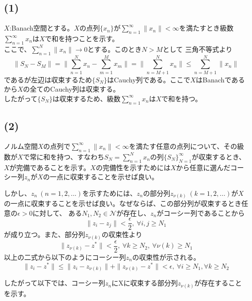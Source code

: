 \documentclass[a4paper,10pt]{jsarticle}
\begin{document}
\subsection{(1)}
$X$:Banach空間とする。$X$の点列$\{x_n\}$が$\sum_{n=1}^\infty \|x_n\| < \infty$を満たすとき級数$\sum_{n=1}^\infty x_n$は$X$で和を持つことを示す。\\

ここで、$\sum_{n=1}^N\|x_n\|\to0$とする。このとき$N>M$として
三角不等式より
\begin{equation}
 \|S_N-S_M\|=\|\sum_{n=1}^Nx_n -\sum_{m=1}^Mx_m\|=\|\sum_{n=M+1}^Nx_n\|\le\sum_{n=M+1}^N\|x_n\|
\end{equation}
であるが左辺は収束するため$\{S_N\}$はCauchy列である。ここで$X$はBanachであるから$X$の全てのCauchy列は収束する。\\
したがって$\{S_N\}$は収束するため、級数$\sum_{n=1}^\infty x_n$は$X$で和を持つ。

\subsection{(2)}
ノルム空間$X$の点列で$\sum_{n=1}^\infty \|x_n\| < \infty$を満たす任意の点列について、その級数が$X$で常に和を持つ、すなわち$S_N = \sum_{n=1}^N x_n$の列$\{S_N\}_{N=1}^\infty$が収束するとき、
$X$が完備であることを示す。$X$の完備性を示すためには$X$から任意に選んだコーシー列$z_n$が$X$の一点に収束することを示せば良い。

しかし、$z_n~(n=1,2,...)$を示すためには、$z_n$の部分列$z_{\nu(k)}~(k=1,2,...)$が$X$の一点に収束することを示せば良い。なぜならば、この部分列が収束するとき任意の$\epsilon>0$に対して、
ある$N_1,N_2\in\mathcal{N}$が存在し、$z_n$がコーシー列であることから
\begin{equation}
 \|z_i - z_j\|<\frac{\epsilon}{2},~\forall i,j\ge N_1
\end{equation}
が成り立つ。また、部分列$z_{\nu(k)}$の収束性より
\begin{equation}
 \|z_{\nu(k)}-z^*\|<\frac{\epsilon}{2},~\forall k\ge N_2,~\forall \nu(k)\ge N_1
\end{equation}
以上の二式から以下のようにコーシー列$z_n$の収束性が示される。
\begin{equation}
 \|z_i - z^*\|\le\|z_i-z_{\nu(k)}\|+\|z_{\nu(k)}-z^*\|<\epsilon,~\forall i\ge N_1,\forall k \ge N_2
\end{equation}

したがって以下では、コーシー列$z_n$にXに収束する部分列$z_{\nu(k)}$が存在することを示す。\\
\end{document}
